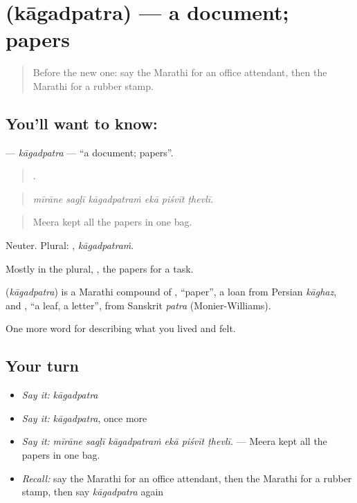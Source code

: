 \section[\texorpdfstring{\mr{कागदपत्र} (kāgadpatra)}{कागदपत्र (kāgadpatra)}]{ (kāgadpatra) — a document; papers}

\label{lesson:MR-C506-kagadpatra}



\begin{quote}
Before the new one: say the Marathi for an office attendant, then the Marathi for a rubber stamp.
\end{quote}

\subsection*{You'll want to know: }
\textbf{} — \emph{kāgadpatra} — \textquotedblleft{}a document; papers\textquotedblright{}.

\begin{quote}
     .
\end{quote}

\begin{quote}
\emph{mīrāne sagḷī kāgadpatraṁ ekā piśvīt ṭhevlī.}
\end{quote}

\begin{quote}
Meera kept all the papers in one bag.
\end{quote}

Neuter. Plural: , \emph{kāgadpatraṁ}.

Mostly in the plural, , the papers for a task.

\begin{cousinweb}
\textbf{} (\emph{kāgadpatra}) is a Marathi compound of , \textquotedblleft{}paper\textquotedblright{}, a loan from Persian \emph{kāghaz}, and , \textquotedblleft{}a leaf, a letter\textquotedblright{}, from Sanskrit \emph{patra} (Monier-Williams).
\end{cousinweb}

\begin{grammarlens}[title={What you've built}]
One more word for describing what you lived and felt.
\end{grammarlens}

\subsection*{Your turn}
\begin{itemize}
\raggedright
  \item \emph{Say it:} \emph{kāgadpatra}
  \item \emph{Say it:} \emph{kāgadpatra}, once more
  \item \emph{Say it:} \emph{mīrāne sagḷī kāgadpatraṁ ekā piśvīt ṭhevlī.} — Meera kept all the papers in one bag.
  \item \emph{Recall:} say the Marathi for an office attendant, then the Marathi for a rubber stamp, then say \emph{kāgadpatra} again
\end{itemize}

